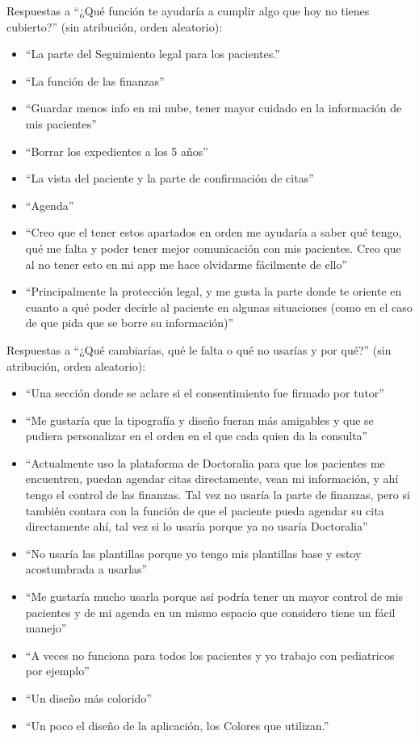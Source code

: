 \documentclass[12pt, a4paper]{article}
\begin{document}
Respuestas a ``¿Qué función te ayudaría a cumplir algo que hoy no tienes cubierto?'' (sin atribución, orden aleatorio):
\begin{itemize}[leftmargin=*,itemsep=0pt]
  \item ``La parte del Seguimiento legal para los pacientes.''
  \item ``La función de las finanzas''
  \item ``Guardar menos info en mi nube, tener mayor cuidado en la información de mis pacientes''
  \item ``Borrar los expedientes a los 5 años''
  \item ``La vista del paciente y la parte de confirmación de citas''
  \item ``Agenda''
  \item ``Creo que el tener estos apartados en orden me ayudaría a saber qué tengo, qué me falta y poder tener mejor comunicación con mis pacientes. Creo que al no tener esto en mi app me hace olvidarme fácilmente de ello''
  \item ``Principalmente la protección legal, y me gusta la parte donde te oriente en cuanto a qué poder decirle al paciente en algunas situaciones (como en el caso de que pida que se borre su información)''
\end{itemize}

Respuestas a ``¿Qué cambiarías, qué le falta o qué no usarías y por qué?'' (sin atribución, orden aleatorio):
\begin{itemize}[leftmargin=*,itemsep=0pt]
  \item ``Una sección donde se aclare si el consentimiento fue firmado por tutor''
  \item ``Me gustaría que la tipografía y diseño fueran más amigables y que se pudiera personalizar en el orden en el que cada quien da la consulta''
  \item ``Actualmente uso la plataforma de Doctoralia para que los pacientes me encuentren, puedan agendar citas directamente, vean mi información, y ahí tengo el control de las finanzas. Tal vez no usaría la parte de finanzas, pero si también contara con la función de que el paciente pueda agendar su cita directamente ahí, tal vez si lo usaría porque ya no usaría Doctoralia''
  \item ``No usaría las plantillas porque yo tengo mis plantillas base y estoy acostumbrada a usarlas''
  \item ``Me gustaría mucho usarla porque así podría tener un mayor control de mis pacientes y de mi agenda en un mismo espacio que considero tiene un fácil manejo''
  \item ``A veces no funciona para todos los pacientes y yo trabajo con pediatricos por ejemplo''
  \item ``Un diseño más colorido''
  \item ``Un poco el diseño de la aplicación, los Colores que utilizan.''
\end{itemize}
\end{document}
